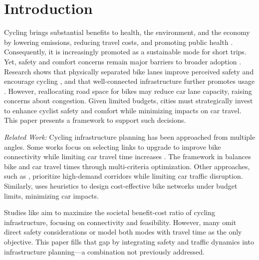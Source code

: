 \documentclass[letterpaper, 10 pt, conference]{ieeeconf}  %
\begin{document}


\section{Introduction} 

Cycling brings substantial benefits to health, the environment, and the economy by lowering emissions, reducing travel costs, and promoting public health \cite{garrard2012health}. Consequently, it is increasingly promoted as a sustainable mode for short trips. Yet, safety and comfort concerns remain major barriers to broader adoption \cite{fishman2012barriers}. Research shows that physically separated bike lanes improve perceived safety and encourage cycling \cite{lawrence2018cyclist}, and that well-connected infrastructure further promotes usage \cite{pucher2011walking}. However, reallocating road space for bikes may reduce car lane capacity, raising concerns about congestion. Given limited budgets, cities must strategically invest to enhance cyclist safety and comfort while minimizing impacts on car travel. This paper presents a framework to support such decisions.

\textit{Related Work:}  
Cycling infrastructure planning has been approached from multiple angles. Some works focus on selecting links to upgrade to improve bike connectivity while limiting car travel time increases \cite{mesbah2012bilevel, smith2012mathematical}. The framework in \cite{wiedemann2025bike} balances bike and car travel times through multi-criteria optimization. Other approaches, such as \cite{mahfouz2023road}, prioritize high-demand corridors while limiting car traffic disruption. Similarly, \cite{shui2019optimization} uses heuristics to design cost-effective bike networks under budget limits, minimizing car impacts.

Studies like \cite{paulsen2023societally, duthie2014optimization} aim to maximize the societal benefit-cost ratio of cycling infrastructure, focusing on connectivity and feasibility. However, many omit direct safety considerations or model both modes with travel time as the only objective. This paper fills that gap by integrating safety and traffic dynamics into infrastructure planning—a combination not previously addressed.
\end{document}
